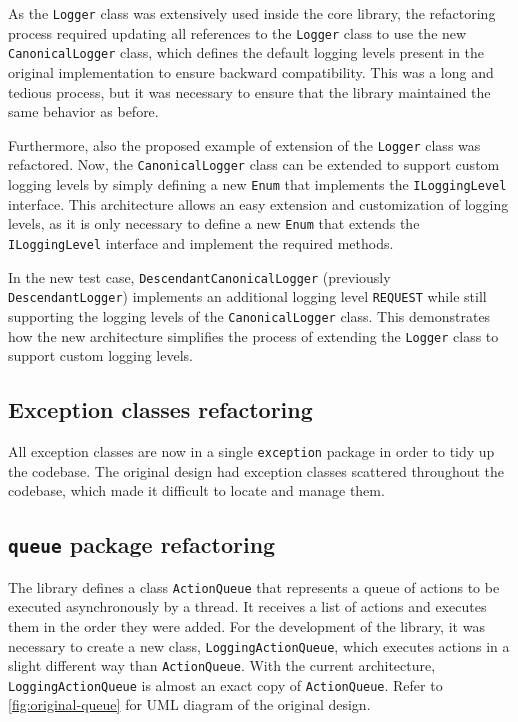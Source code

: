 As the \texttt{Logger} class was extensively used inside the core library, the refactoring process required updating all references to the \texttt{Logger} class to use the new \texttt{CanonicalLogger} class, which defines the default logging levels present in the original implementation to ensure backward compatibility. This was a long and tedious process, but it was necessary to ensure that the library maintained the same behavior as before.

Furthermore, also the proposed example of extension of the \texttt{Logger} class was refactored. Now, the \texttt{CanonicalLogger} class can be extended to support custom logging levels by simply defining a new \texttt{Enum} that implements the \texttt{ILoggingLevel} interface. This architecture allows an easy extension and customization of logging levels, as it is only necessary to define a new \texttt{Enum} that extends the \texttt{ILoggingLevel} interface and implement the required methods.

In the new test case, \texttt{DescendantCanonicalLogger} (previously \texttt{DescendantLogger}) implements an additional logging level \texttt{REQUEST} while still supporting the logging levels of the \texttt{CanonicalLogger} class. This demonstrates how the new architecture simplifies the process of extending the \texttt{Logger} class to support custom logging levels.

\subsection{Exception classes refactoring}

All exception classes are now in a single \texttt{exception} package in order to tidy up the codebase. The original design had exception classes scattered throughout the codebase, which made it difficult to locate and manage them.

\subsection{\texttt{queue} package refactoring}

The library defines a class \texttt{ActionQueue} that represents a queue of actions to be executed asynchronously by a thread. It receives a list of actions and executes them in the order they were added. For the development of the library, it was necessary to create a new class, \texttt{LoggingActionQueue}, which executes actions in a slight different way than \texttt{ActionQueue}. With the current architecture, \texttt{LoggingActionQueue} is almost an exact copy of \texttt{ActionQueue}. Refer to \autoref{fig:original-queue} for UML diagram of the original design.

